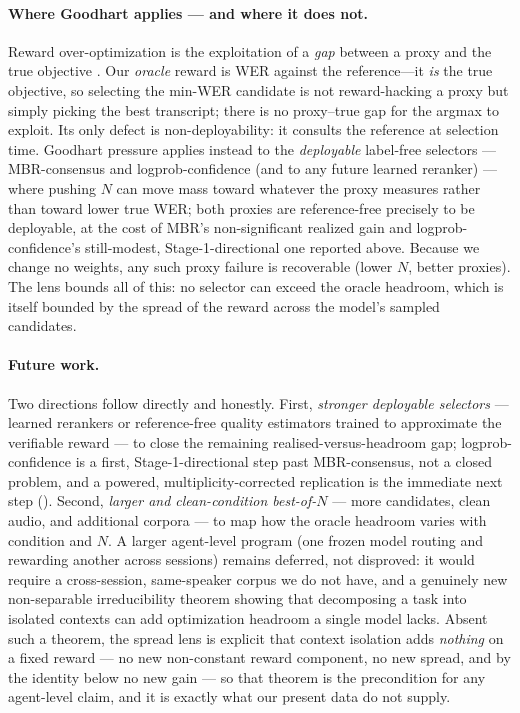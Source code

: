 \paragraph{Where Goodhart applies --- and where it does not.}
Reward over-optimization is the exploitation of a \emph{gap} between a proxy and the true objective
\citep{gao2023overopt,skalse2022rewardhacking,rlvrincentive2025}. Our \emph{oracle} reward is WER against
the reference---it \emph{is} the true objective, so selecting the min-WER candidate is not reward-hacking
a proxy but simply picking the best transcript; there is no proxy--true gap for the argmax to exploit. Its
only defect is non-deployability: it consults the reference at selection time. Goodhart pressure applies
instead to the \emph{deployable} label-free selectors --- MBR-consensus and logprob-confidence (and to
any future learned reranker) --- where pushing $N$ can move mass toward whatever the proxy measures
rather than toward lower true WER; both proxies are reference-free precisely to be deployable, at the
cost of MBR's non-significant realized gain and logprob-confidence's still-modest, Stage-1-directional
one reported above. Because we change no weights, any such proxy failure is recoverable (lower $N$, better proxies).
The lens bounds all of this: no selector can exceed the oracle headroom, which is itself bounded by the
spread of the reward across the model's sampled candidates.

\paragraph{Future work.}
Two directions follow directly and honestly. First, \emph{stronger deployable selectors} --- learned
rerankers or reference-free quality estimators trained to approximate the verifiable reward --- to
close the remaining realised-versus-headroom gap; logprob-confidence is a first, Stage-1-directional
step past MBR-consensus, not a closed problem, and a powered, multiplicity-corrected replication is the
immediate next step (). Second, \emph{larger and
clean-condition best-of-$N$} --- more candidates, clean audio, and additional corpora --- to map how
the oracle headroom varies with condition and $N$. A larger agent-level program (one frozen model
routing and rewarding another across sessions) remains deferred, not disproved: it would require a
cross-session, same-speaker corpus we do not have, and a genuinely new non-separable irreducibility
theorem showing that decomposing a task into isolated contexts can add optimization headroom a single
model lacks. Absent such a theorem, the spread lens is explicit that context isolation adds
\emph{nothing} on a fixed reward --- no new non-constant reward component, no new spread, and by the
identity below no new gain --- so that theorem is the precondition for any agent-level claim, and it is
exactly what our present data do not supply.

